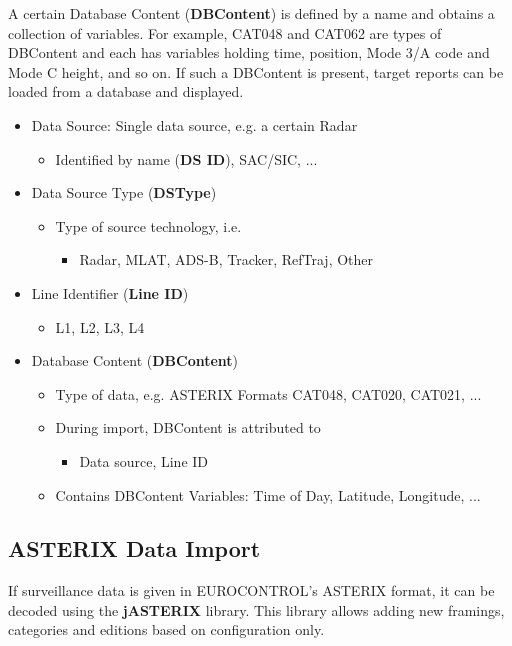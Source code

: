 A certain Database Content (\textbf{DBContent}) is defined by a name and obtains a collection of variables. 
For example, CAT048 and CAT062 are types of DBContent and each has variables holding time, position, Mode 3/A code and Mode C height, and so on. 
If such a DBContent is present, target reports can be loaded from a database and displayed.\\

\begin{itemize}
\item Data Source: Single data source, e.g. a certain Radar
\begin{itemize}
\item Identified by name (\textbf{DS ID}), SAC/SIC, ...
\end{itemize}
\item Data Source Type (\textbf{DSType})
\begin{itemize}
\item Type of source technology, i.e.
\begin{itemize}
\item Radar, MLAT, ADS-B, Tracker, RefTraj, Other
\end{itemize}
\end{itemize}
\item Line Identifier (\textbf{Line ID})
\begin{itemize}
\item L1, L2, L3, L4
\end{itemize}
\item Database Content (\textbf{DBContent}) 
\begin{itemize}
\item Type of data, e.g. ASTERIX Formats CAT048, CAT020, CAT021, ...
\item During import, DBContent is attributed to 
\begin{itemize}
\item Data source, Line ID
\end{itemize}
\item Contains DBContent Variables: Time of Day, Latitude, Longitude, ...
\end{itemize}
\end{itemize}

\subsection*{ASTERIX Data Import}
If surveillance data is given in EUROCONTROL's ASTERIX format, it can be decoded using the \textbf{jASTERIX} library. This library allows adding new framings, categories and editions based on configuration only. \\\\

